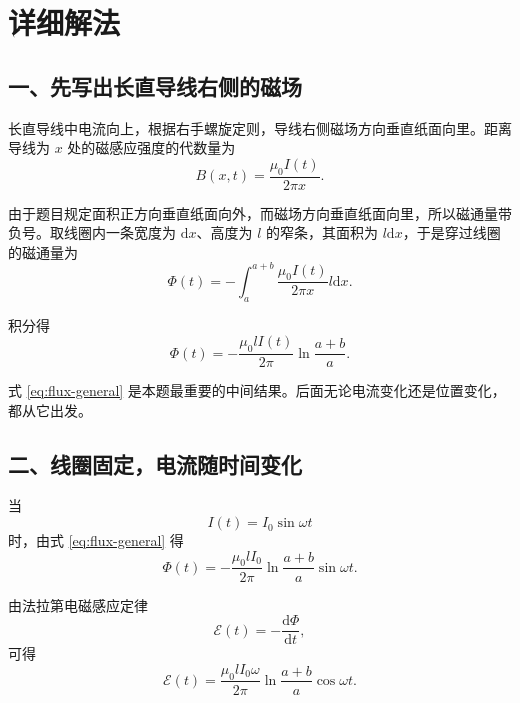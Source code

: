 \documentclass[11pt,a4paper,fontset=fandol]{ctexart}
\newcommand{\dd}{\mathrm{d}}
\newcommand{\emf}{\mathcal{E}}
\begin{document}
\section*{详细解法}

\subsection*{一、先写出长直导线右侧的磁场}
长直导线中电流向上，根据右手螺旋定则，导线右侧磁场方向垂直纸面向里。距离导线为 $x$ 处的磁感应强度的代数量为
\begin{equation}
 B(x,t)=\frac{\mu_0 I(t)}{2\pi x}.
 \label{eq:b-long-wire}
\end{equation}

由于题目规定面积正方向垂直纸面向外，而磁场方向垂直纸面向里，所以磁通量带负号。取线圈内一条宽度为 $\dd x$、高度为 $l$ 的窄条，其面积为 $l\dd x$，于是穿过线圈的磁通量为
\begin{equation}
 \Phi(t)=-\int_a^{a+b}\frac{\mu_0 I(t)}{2\pi x}l\dd x.
 \label{eq:flux-integral}
\end{equation}

积分得
\begin{equation}
 \Phi(t)=-\frac{\mu_0 l I(t)}{2\pi}\ln\frac{a+b}{a}.
 \label{eq:flux-general}
\end{equation}

式 \eqref{eq:flux-general} 是本题最重要的中间结果。后面无论电流变化还是位置变化，都从它出发。

\subsection*{二、线圈固定，电流随时间变化}
当
\begin{equation}
 I(t)=I_0\sin\omega t
 \label{eq:current-sinusoidal}
\end{equation}
时，由式 \eqref{eq:flux-general} 得
\begin{equation}
 \Phi(t)=-\frac{\mu_0 l I_0}{2\pi}\ln\frac{a+b}{a}\sin\omega t.
 \label{eq:flux-sinusoidal}
\end{equation}

由法拉第电磁感应定律
\begin{equation}
 \emf(t)=-\frac{\dd\Phi}{\dd t},
 \label{eq:faraday-law}
\end{equation}
可得
\begin{equation}
 \emf(t)=\frac{\mu_0 l I_0\omega}{2\pi}\ln\frac{a+b}{a}\cos\omega t.
 \label{eq:emf-sinusoidal}
\end{equation}
\end{document}
